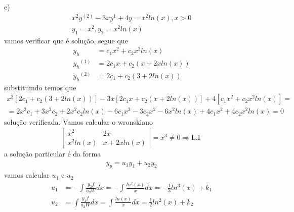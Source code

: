 \documentclass[a4paper,12pt]{article}
\begin{document}
e) 
\begin{align*}
	x^{2}y^{(2)} -3xy^{1} + 4y = x^{2}ln(x),  x > 0 \\
	y_1 = x^{2}, y_2 = x^{2} ln(x)
\end{align*}
vamos verificar que \'e solu\c c\~ao, segue que 
\begin{align*}
	y_h &= c_1 x^{2} + c_2 x^{2} ln(x) \\
	{y_h}^{(1)} &= 2c_1 x + c_2 (x + 2x ln(x)) \\
	{y_h}^{(2)} &= 2c_1 + c_2 (3 + 2ln(x)) 
\end{align*}
substituindo temos que 
\begin{align*}
	x^{2} [ 2 c_1 + c_2 (3 + 2ln(x))] -3x[2c_1 x + c_2 (x + 2ln(x))] + 4 [ c_1 x^{2} + c_2 x^{2} ln(x)] = \\
	= 2x^{2}c_1 + 3x^{2}c_2 + 2x^{2}c_2 ln(x) -6 c_1 x^{2} -3c_2 x^{2} -6x^{2}ln(x) + 4c_1 x^{2} + 4c_2 x^{2} ln(x)
	= 0
\end{align*}
solu\c c\~ao verificada. Vamos calcular o wronskiano
\[\left |
	\begin{array}{cc}	
		x^{2} & 2x \\
		x^{2}ln(x) & x + 2xln(x)
	\end{array}
	\right | = x^{3} \neq 0 \Rightarrow \mbox{L.I}
\]
a solu\c c\~ao particular \'e da forma 
\begin{align*}
	y_p = u_1 y_1 + u_2 y_2
\end{align*}
vamos calcular $u_1$ e $u_2$
\begin{align*}
	u_1 &= - \int \frac{y_2 f}{a_2 W} dx = - \int \frac{ln^{2} (x)}{x} dx = -\frac{1}{3} ln^{3} (x) + k_1 \\
	u_2 &= \int \frac{y_1 f}{a_2 W} dx = \int \frac{ln (x)}{x} dx  = \frac{1}{2} ln^{2} (x) + k_2
\end{align*}
\end{document}
